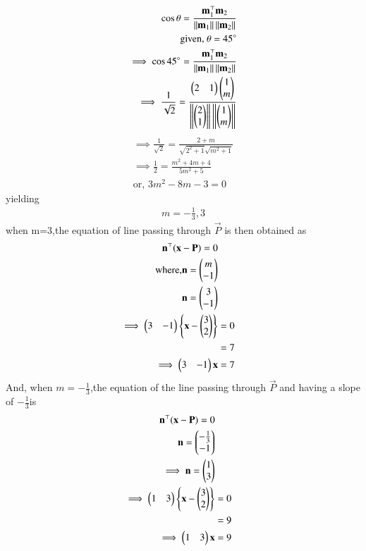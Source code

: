\begin{align}
\cos \theta = \frac{\mathbf{m}_1^\top \mathbf{m}_2}{\left\Vert\mathbf{m}_1\right\Vert\left\Vert\mathbf{m}_2\right\Vert}\\
	\text{given, } \theta = 45\degree\\
\implies \cos45\degree =  \frac{\mathbf{m}_1^\top \mathbf{m}_2}{\left\Vert\mathbf{m}_1\right\Vert\left\Vert\mathbf{m}_2\right\Vert}\\
\implies \frac{1}{\sqrt{2}} = \frac{\begin{pmatrix}2 & 1\end{pmatrix} \begin{pmatrix}1\\m\end{pmatrix}}{\left\Vert\begin{pmatrix}2\\1\end{pmatrix}\right\Vert\left\Vert\begin{pmatrix}1\\m\end{pmatrix}\right\Vert}
\end{align}
\begin{align}
\implies \frac{1}{\sqrt{2}}=\frac{2+m}{\sqrt{2^2 + 1}\sqrt{m^2 + 1}}\\
\implies \frac{1}{2}=\frac{m^2 + 4m +4}{5m^2 +5}\\
\text{or, } 3m^2 - 8m -3 = 0
\end{align}
yielding
\begin{align}
m= - \frac{1}{3}, 3
\end{align} 
when m=3,the equation of line passing through $\vec{P}$  is then obtained as
\begin{align}
\mathbf{n}^{\top} ({\mathbf{x}-\mathbf{P}}) = 0\\
\text{where,}{\mathbf{n}}=\begin{pmatrix}m\\-1\end{pmatrix} \\
{\mathbf{n}}=\begin{pmatrix}3\\-1\end{pmatrix} \\
\implies 
	\begin{pmatrix}3&-1\end{pmatrix}\left\{\mathbf{x}-\begin{pmatrix}3\\2\end{pmatrix}\right\}&=0\\
	&=7 \\
 \implies 	\begin{pmatrix}3 & -1\end{pmatrix}\mathbf{x} &= 7
\end{align}
And, when $m=-\frac{1}{3}$,the equation of the line passing through $\vec{P}$  and having a slope of $-\frac{1}{3}$is
\begin{align}
\mathbf{n}^{\top} ({\mathbf{x}-\mathbf{P}}) = 0\\
{\mathbf{n}}=\begin{pmatrix}-\frac{1}{3}\\-1\end{pmatrix} \\
\implies {\mathbf{n}}=\begin{pmatrix}1\\3\end{pmatrix} \\
\implies 
	\begin{pmatrix}1&3\end{pmatrix}\left\{\mathbf{x}-\begin{pmatrix}3\\2\end{pmatrix}\right\}&=0\\
	&=9 \\
		\implies 	\begin{pmatrix}1 & 3\end{pmatrix}\mathbf{x} &= 9
\end{align}
